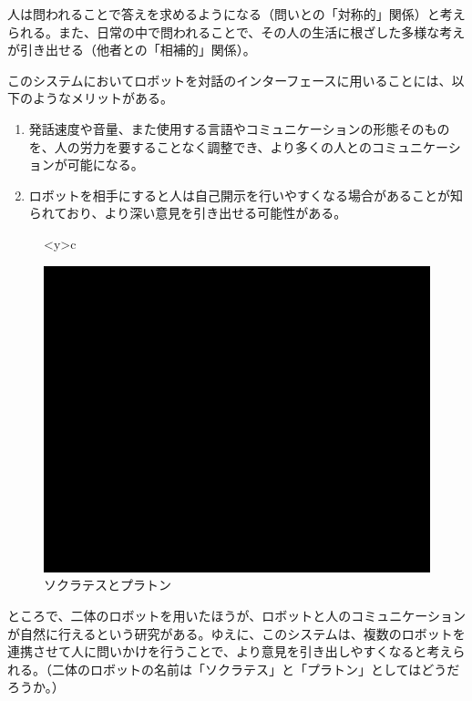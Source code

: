 \documentclass[b5j,twoside,twocolumn]{utarticle}
\begin{document}
人は問われることで答えを求めるようになる（問いとの「対称的」関係）と考えられる。また、日常の中で問われることで、その人の生活に根ざした多様な考えが引き出せる（他者との「相補的」関係）。


このシステムにおいてロボットを対話のインターフェースに用いることには、以下のようなメリットがある。
\begin{enumerate}
\renewcommand{\labelenumi}{\pbox<y>{(\arabic{enumi})}}
\item 発話速度や音量、また使用する言語やコミュニケーションの形態そのものを、人の労力を要することなく調整でき、より多くの人とのコミュニケーションが可能になる。
\item ロボットを相手にすると人は自己開示を行いやすくなる場合があることが知られており\cite{SHIMA}\cite{KAIJI}、より深い意見を引き出せる可能性がある。
\end{enumerate}

\begin{figure}[h]
\centering
\begin{tabular}<y>{c}
\begin{minipage}[c]{0.65\hsize}
\centering
\includegraphics[scale=0.5]{system1}
\caption{ソクラテスとプラトン}
\end{minipage}
\end{tabular}
\end{figure}

ところで、二体のロボットを用いたほうが、ロボットと人のコミュニケーションが自然に行えるという研究がある\cite{MUL}。ゆえに、このシステムは、複数のロボットを連携させて人に問いかけを行うことで、より意見を引き出しやすくなると考えられる。（二体のロボットの名前は「ソクラテス」と「プラトン」としてはどうだろうか。）
\end{document}
